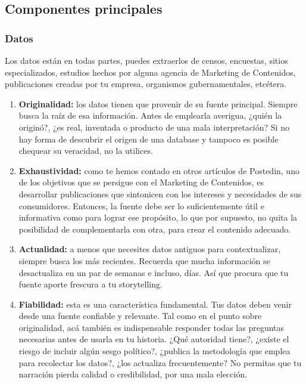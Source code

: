 \documentclass[11pt]{article}
\begin{document}
\subsection{Componentes principales}

\subsubsection{Datos}
Los datos están en todas partes, puedes extraerlos de censos, encuestas, sitios especializados, estudios hechos por alguna agencia de Marketing de Contenidos, publicaciones creadas por tu empresa, organismos gubernamentales, etcétera.

\begin{enumerate}
    \item \textbf{Originalidad:} los datos tienen que provenir de su fuente principal. Siempre busca la raíz de esa información. Antes de emplearla averigua, ¿quién la originó?, ¿es real, inventada o producto de una mala interpretación? Si no hay forma de descubrir el origen de una database y tampoco es posible chequear su veracidad, no la utilices.
    \item \textbf{Exhaustividad:} como te hemos contado en otros artículos de Postedin, uno de los objetivos que se persigue con el Marketing de Contenidos, es desarrollar publicaciones que sintonicen con los intereses y necesidades de sus consumidores. Entonces, la fuente debe ser lo suficientemente útil e informativa como para lograr ese propósito, lo que por supuesto, no quita la posibilidad de complementarla con otra, para crear el contenido adecuado.
\item \textbf{Actualidad:} a menos que necesites datos antiguos para contextualizar, siempre busca los más recientes. Recuerda que mucha información se desactualiza en un par de semanas e incluso, días. Así que procura que tu fuente aporte frescura a tu storytelling.
\item \textbf{Fiabilidad:} esta es una característica fundamental. Tus datos deben venir desde una fuente confiable y relevante. Tal como en el punto sobre originalidad, acá también es indispensable responder todas las preguntas necesarias antes de usarla en tu historia. ¿Qué autoridad tiene?, ¿existe el riesgo de incluir algún sesgo político?, ¿publica la metodología que emplea para recolectar los datos?, ¿los actualiza frecuentemente? No permitas que tu narración pierda calidad o credibilidad, por una mala elección.
\end{enumerate}
\end{document}
